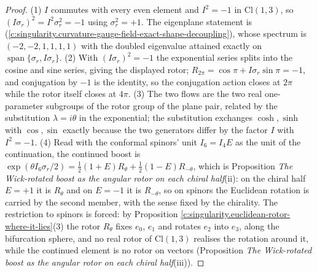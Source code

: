 \documentclass[11pt]{article}
\theoremstyle{definition}
\theoremstyle{plain}
\providecommand{\Cl}{}\renewcommand{\Cl}{\mathrm{Cl}}
\begin{document}
\begin{proof}
(1) $I$ commutes with every even element and $I^{2} = -1$ in $\Cl(1,3)$, so $(I\sigma_r)^{2} = I^{2}\sigma_r^{2} = -1$ using $\sigma_r^{2} = +1$. The eigenplane statement is \cite[Thm.~6.1]{ButlerT5} (\ref{c:singularity.curvature-gauge-field-exact-shape-decoupling}), whose spectrum is $(-2,-2,1,1,1,1)$ with the doubled eigenvalue attained exactly on $\operatorname{span}\{\sigma_r, I\sigma_r\}$. (2) With $(I\sigma_r)^{2} = -1$ the exponential series splits into the cosine and sine series, giving the displayed rotor; $R_{2\pi} = \cos\pi + I\sigma_r\sin\pi = -1$, and conjugation by $-1$ is the identity, so the conjugation action closes at $2\pi$ while the rotor itself closes at $4\pi$. (3) The two flows are the two real one-parameter subgroups of the rotor group of the plane pair, related by the substitution $\lambda = i\theta$ in the exponential; the substitution exchanges $\cosh, \sinh$ with $\cos, \sin$ exactly because the two generators differ by the factor $I$ with $I^{2} = -1$. (4) Read with the conformal spinors' unit $I_{6} = I_{4}E$ as the unit of the continuation, the continued boost is $\exp(\theta I_{6}\sigma_r/2) = \tfrac12(1+E)R_\theta + \tfrac12(1-E)R_{-\theta}$, which is Proposition \emph{The Wick-rotated boost as the angular rotor on each chiral half}(ii): on the chiral half $E = +1$ it is $R_\theta$ and on $E = -1$ it is $R_{-\theta}$, so on spinors the Euclidean rotation is carried by the second member, with the sense fixed by the chirality. The restriction to spinors is forced: by Proposition \ref{c:singularity.euclidean-rotor-where-it-lies}(3) the rotor $R_\theta$ fixes $e_0$, $e_1$ and rotates $e_2$ into $e_3$, along the bifurcation sphere, and no real rotor of $\Cl(1,3)$ realises the rotation around it, while the continued element is no rotor on vectors (Proposition \emph{The Wick-rotated boost as the angular rotor on each chiral half}(iii)).

\end{proof}
\end{document}
